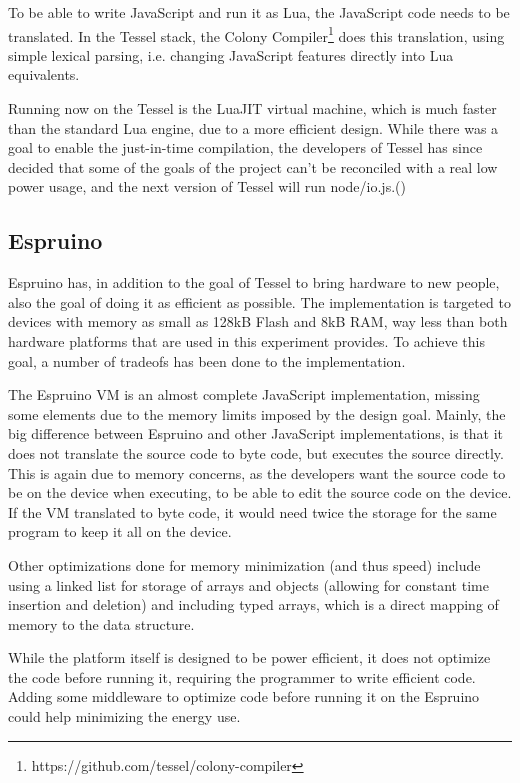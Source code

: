 To be able to write JavaScript and run it as Lua, the JavaScript code needs to be translated.
In the Tessel stack, the Colony Compiler\footnote{https://github.com/tessel/colony-compiler} does this translation, using simple lexical parsing, i.e. changing JavaScript features directly into Lua equivalents.

Running now on the Tessel is the LuaJIT virtual machine, which is much faster than the standard Lua engine, due to a more efficient design. While there was a goal to enable the just-in-time compilation, the developers of Tessel has since decided that some of the goals of the project can’t be reconciled with a real low power usage, and the next version of Tessel will run node/io.js.(\cite{movingfaster})

\subsection{Espruino}
Espruino has, in addition to the goal of Tessel to bring hardware to new people, also the goal of doing it as efficient as possible.
The implementation is targeted to devices with memory as small as 128kB Flash and 8kB RAM, way less than both hardware platforms that are used in this experiment provides.
To achieve this goal, a number of tradeofs has been done to the implementation.

The Espruino VM is an almost complete JavaScript implementation, missing some elements due to the memory limits imposed by the design goal. 
Mainly, the big difference between Espruino and other JavaScript implementations, is that it does not translate the source code to byte code, but executes the source directly. 
This is again due to memory concerns, as the developers want the source code to be on the device when executing, to be able to edit the source code on the device. 
If the VM translated to byte code, it would need twice the storage for the same program to keep it all on the device.

Other optimizations done for memory minimization (and thus speed) include using a linked list for storage of arrays and objects (allowing for constant time insertion and deletion) and including typed arrays, which is a direct mapping of memory to the data structure.

While the platform itself is designed to be power efficient, it does not optimize the code before running it, requiring the programmer to write efficient code. 
Adding some middleware to optimize code before running it on the Espruino could help minimizing the energy use.


